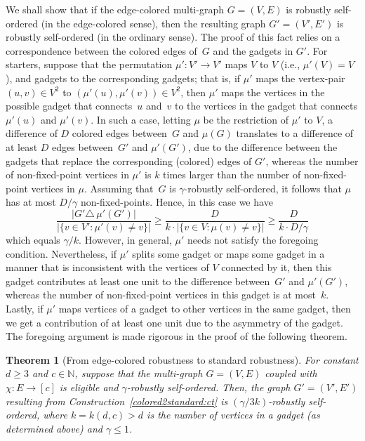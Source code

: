 \documentclass[10pt,a4paper]{article}
\newtheorem{theorem}{Theorem}[section]
\theoremstyle{definition}
\newcommand{\N}{\mathbb N}
\newcommand{\BT}{\begin{theorem}}   \newcommand{\ET}{\end{theorem}}
\begin{document}
%
%
%
%
%
%
%
%
%
%
%

We shall show that if the edge-colored multi-graph $G=(V,E)$
is robustly self-ordered (in the edge-colored sense),
then the resulting graph $G'=(V',E')$ is robustly self-ordered
(in the ordinary sense). The proof of this fact relies on
a correspondence between the colored edges of~$G$ and the gadgets in $G'$.
For starters, suppose that the permutation $\mu':V'\to V'$
%
maps $V$ to $V$ (i.e., $\mu'(V)=V$),
and gadgets to the corresponding gadgets; that is,
if $\mu'$ maps the vertex-pair $(u,v)\in V^2$
to $(\mu'(u),\mu'(v))\in V^2$,
then $\mu'$ maps the vertices in the possible gadget that
connects~$u$ and~$v$ to the vertices in the gadget that
connects $\mu'(u)$ and $\mu'(v)$.
%
%
%
%
In such a case, letting $\mu$ be the restriction of $\mu'$ to $V$,
a difference of $D$ colored edges between~$G$ and $\mu(G)$
translates to a difference of
at least $D$ edges between~$G'$ and $\mu'(G')$,
due to the difference between the gadgets
that replace the corresponding (colored) edges of $G'$,
%
%
%
%
whereas the number of non-fixed-point vertices in $\mu'$ is $k$ times
larger than the number of non-fixed-point vertices in $\mu$.
%
Assuming that~$G$ is $\gamma$-robustly self-ordered,
it follows that $\mu$ has at most $D/\gamma$ non-fixed-points.
Hence, in this case we have
 \begin{equation*}
\frac{|G'\triangle\,\mu'(G')|}{|\{v\in V':\mu'(v)\!\neq\!v\}|}
%
  \geq \frac{D}{k\cdot|\{v\in V:\mu(v)\!\neq\!v\}|}
   \geq \frac{D}{k\cdot D/\gamma}
 \end{equation*}
which equals $\gamma/k$.
%
%
However, in general, $\mu'$ needs not satisfy the foregoing condition.
Nevertheless, if $\mu'$ splits some gadget
or maps some gadget in a manner that is inconsistent with
the vertices of $V$ connected by it,
then this gadget contributes at least one unit
to the difference between~$G'$ and $\mu'(G')$,
whereas the number of non-fixed-point vertices in this gadget
is at most~$k$.
Lastly, if $\mu'$ maps vertices of a gadget to other
vertices in the same gadget, then we get a contribution
of at least one unit due to the asymmetry of the gadget.
The foregoing argument is made rigorous in the proof of the following theorem.

\BT[From edge-colored robustness to standard robustness]
\label{colored2std:clm}
For constant $d\geq3$ and $c\in\N$,
suppose that the multi-graph $G=(V,E)$ coupled with $\chi\!:\!E\!\to\![c]$
is eligible and $\gamma$-robustly self-ordered.
%
%
%
%
%
%
%
%
%
%
%
Then, the graph $G'=(V',E')$ resulting from
Construction~\ref{colored2standard:ct}
is $(\gamma/3k)$-robustly self-ordered,
%
where $k=k(d,c)>d$ is the number of vertices in a gadget
{\rm(as determined above)} and $\gamma\leq1$.
%
%
\ET
%
%
%
%
\end{document}
